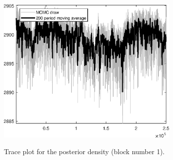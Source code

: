 \begin{figure}[H]
\centering
  \includegraphics[width=0.8\textwidth]{BRS_imp_mobility_alt/graphs/TracePlot_Posterior_blck_1}\\
    \caption{Trace plot for the posterior density (block number 1).}
\end{figure}
